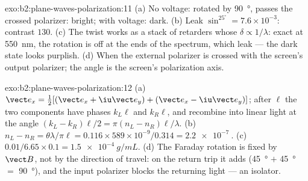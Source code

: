 \begin{solution}{exo:b2:plane-waves-polarization:11}
(a) No voltage: rotated by \qty{90}{\degree}, passes the crossed polarizer:
bright; with voltage: dark. (b) Leak $\sin^25^\circ = 7.6 \times 10^{-3}$: contrast
$130$. (c) The twist works as a stack of retarders whose $\delta \propto 1/\lambda$:
exact at \qty{550}{nm}, the rotation is off at the ends of the spectrum,
which leak --- the dark state looks purplish. (d) When the external
polarizer is crossed with the screen's output polarizer; the angle is
the screen's polarization axis.
\end{solution}

\begin{solution}{exo:b2:plane-waves-polarization:12}
(a) $\vect e_x = \tfrac12[(\vect e_x + \iu\vect e_y) + (\vect e_x - \iu\vect e_y)]$; after $\ell$
the two components have phases $k_L\ell$ and $k_R\ell$, and recombine into
linear light at the angle $(k_L - k_R)\ell/2 = \pi(n_L - n_R)\ell/\lambda$. (b) $n_L -
n_R = \theta\lambda/\pi\ell = 0.116 \times 589 \times 10^{-9}/0.314 = \qty{2.2e-7}{}$. (c)
$0.01/6.65 \times 0.1 = \qty{1.5e-4}{g/mL}$. (d) The Faraday rotation is fixed by
$\vect B$, not by the direction of travel: on the return trip it adds
(\qty{45}{\degree} $+$ \qty{45}{\degree} $=$ \qty{90}{\degree}), and the input polarizer blocks
the returning light --- an isolator.
\end{solution}

